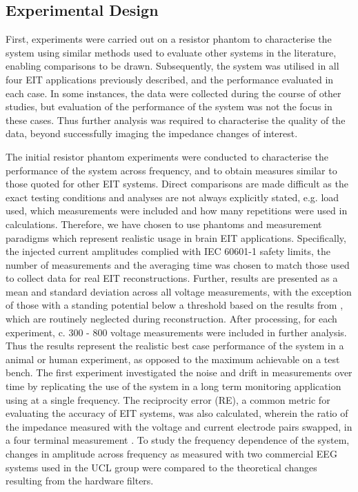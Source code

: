 \subsection{Experimental Design}

First, experiments were carried out on a resistor phantom to characterise the system using similar methods  used to evaluate other systems in the literature, enabling comparisons to be drawn. Subsequently, the system was utilised in all four EIT applications previously described, and the performance evaluated in each case. In some instances, the data were collected during the course of other studies, but evaluation of the performance of the system was not the focus in these cases. Thus further analysis was required to characterise the quality of the data, beyond successfully imaging the impedance changes of interest. 

The initial resistor phantom experiments were conducted to characterise the performance of the system across frequency, and to obtain measures similar to those quoted for other EIT systems. Direct comparisons are made difficult as the exact testing conditions and analyses are not always explicitly stated, e.g. load used, which measurements were included and how many repetitions were used in calculations. Therefore, we have chosen to use phantoms and measurement paradigms which represent realistic usage in brain EIT applications. Specifically, the injected current amplitudes complied with IEC 60601-1 \cite{IEC} safety limits, the number of measurements and the averaging time was chosen to match those used to collect data for real EIT reconstructions. Further, results are presented as a mean and standard deviation across all voltage measurements, with the exception of those with a standing potential below a threshold based on the results from \citet{packham2012comparison}, which are routinely neglected during reconstruction. After processing, for each experiment, c. 300 - 800 voltage measurements were included in further analysis. Thus the results represent the realistic best case performance of the system in a animal or human experiment, as opposed to the maximum achievable on a test bench. The first experiment investigated the noise and drift in measurements over time by replicating the use of the system in a long term monitoring application using at a single frequency. The reciprocity error (RE), a common metric for evaluating the accuracy of EIT systems, was also calculated, wherein the ratio of the impedance measured with the voltage and current electrode pairs swapped, in a four terminal measurement \cite{Wi2013,Oh2011a}. To study the frequency dependence of the system, changes in amplitude across frequency as measured with two commercial EEG systems used in the UCL group were compared to the theoretical changes resulting from the hardware filters. 

